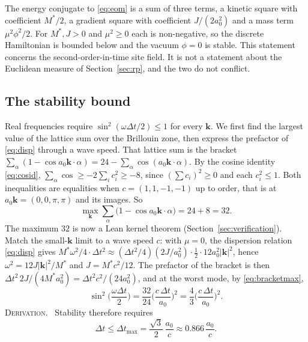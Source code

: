 \documentclass[a4paper,11pt]{article}
\makeatletter
\numberwithin{equation}{section}
\theoremstyle{jsplain}
\theoremstyle{jsrem}
\newcommand{\lbl}[1]{\textcolor{lbl@#1}{\textsc{#1}}.\ }
\makeatother
\begin{document}
The energy conjugate to \eqref{eq:eom} is a sum of three terms, a kinetic square with coefficient $M^*/2$, a gradient square with coefficient $J/(2a_0^2)$ and a mass term $\mu^2\phi^2/2$. For $M^*,J>0$ and $\mu^2\ge0$ each is non-negative, so the discrete Hamiltonian is bounded below and the vacuum $\phi=0$ is stable. This statement concerns the second-order-in-time site field. It is not a statement about the Euclidean measure of Section~\ref{sec:rp}, and the two do not conflict.

\subsection{The stability bound}

Real frequencies require $\sin^2(\omega\Delta t/2)\le1$ for every $\mathbf{k}$. We first find the largest value of the lattice sum over the Brillouin zone, then express the prefactor of \eqref{eq:disp} through a wave speed. That lattice sum is the bracket $\sum_\alpha(1-\cos a_0\mathbf{k}\cdot\alpha)=24-\sum_\alpha\cos(a_0\mathbf{k}\cdot\alpha)$. By the cosine identity \eqref{eq:cosid}, $\sum_\alpha\cos\ge-2\sum_ic_i^2\ge-8$, since $(\sum c_i)^2\ge0$ and each $c_i^2\le1$. Both inequalities are equalities when $c=(1,1,-1,-1)$ up to order, that is at $a_0\mathbf{k}=(0,0,\pi,\pi)$ and its images. So
\begin{equation}\label{eq:bracketmax}
\max_{\mathbf{k}}\sum_{\alpha}\big(1-\cos a_0\mathbf{k}\cdot\alpha\big)=24+8=32 .
\end{equation}
The maximum $32$ is now a Lean kernel theorem (Section~\ref{sec:verification}). Match the small-$\mathbf{k}$ limit to a wave speed $c$: with $\mu=0$, the dispersion relation \eqref{eq:disp} gives $M^*\omega^2/4\cdot\Delta t^2\approx(\Delta t^2/4)(2J/a_0^2)\cdot\tfrac12\cdot12a_0^2|\mathbf{k}|^2$, hence $\omega^2=12J|\mathbf{k}|^2/M^*$ and $J=M^*c^2/12$. The prefactor of the bracket is then $\Delta t^2\,2J/(4M^*a_0^2)=\Delta t^2c^2/(24a_0^2)$, and at the worst mode, by \eqref{eq:bracketmax},
\begin{equation}\label{eq:worst}
\sin^2\!\Big(\frac{\omega\Delta t}{2}\Big)=\frac{32}{24}\Big(\frac{c\,\Delta t}{a_0}\Big)^2=\frac43\Big(\frac{c\,\Delta t}{a_0}\Big)^2 .
\end{equation}
\lbl{Derivation} Stability therefore requires
\begin{equation}\label{eq:cfl}
\Delta t\le\Delta t_{\max}=\frac{\sqrt3}{2}\,\frac{a_0}{c}\approx0.866\,\frac{a_0}{c}.
\end{equation}
\end{document}
